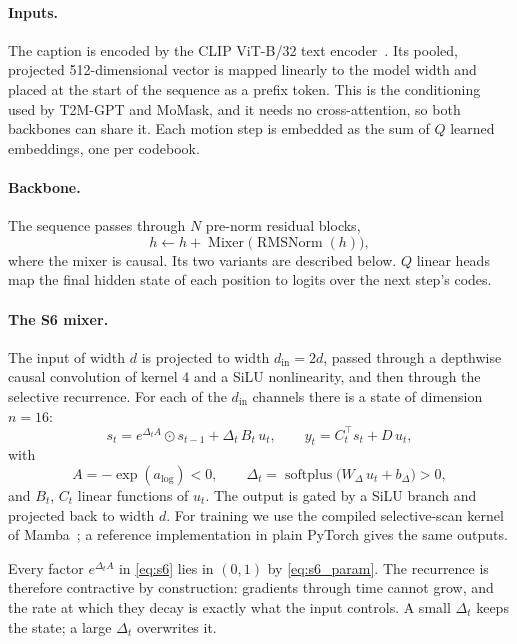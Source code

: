 \paragraph{Inputs.} The caption is encoded by the CLIP ViT-B/32 text encoder~\cite{radford2021clip}. Its pooled, projected 512-dimensional vector is mapped linearly to the model width and placed at the start of the sequence as a prefix token. This is the conditioning used by T2M-GPT and MoMask, and it needs no cross-attention, so both backbones can share it. Each motion step is embedded as the sum of $Q$ learned embeddings, one per codebook.

\paragraph{Backbone.} The sequence passes through $N$ pre-norm residual blocks,
\begin{equation}
h \leftarrow h + \operatorname{Mixer}\bigl(\operatorname{RMSNorm}(h)\bigr),
\end{equation}
where the mixer is causal. Its two variants are described below. $Q$ linear heads map the final hidden state of each position to logits over the next step's codes.

\paragraph{The S6 mixer.} The input of width $d$ is projected to width $d_{\mathrm{in}} = 2d$, passed through a depthwise causal convolution of kernel 4 and a SiLU nonlinearity, and then through the selective recurrence. For each of the $d_{\mathrm{in}}$ channels there is a state of dimension $n = 16$:
\begin{equation}
s_t = e^{\Delta_t A} \odot s_{t-1} + \Delta_t\, B_t\, u_t, \qquad y_t = C_t^{\top} s_t + D\, u_t ,
\label{eq:s6}
\end{equation}
with
\begin{equation}
A = -\exp(a_{\log}) < 0, \qquad \Delta_t = \operatorname{softplus}\bigl(W_\Delta\, u_t + b_\Delta\bigr) > 0,
\label{eq:s6_param}
\end{equation}
and $B_t$, $C_t$ linear functions of $u_t$. The output is gated by a SiLU branch and projected back to width $d$. For training we use the compiled selective-scan kernel of Mamba~\cite{gu2023mamba}; a reference implementation in plain PyTorch gives the same outputs.

Every factor $e^{\Delta_t A}$ in \eqref{eq:s6} lies in $(0, 1)$ by \eqref{eq:s6_param}. The recurrence is therefore contractive by construction: gradients through time cannot grow, and the rate at which they decay is exactly what the input controls. A small $\Delta_t$ keeps the state; a large $\Delta_t$ overwrites it.

